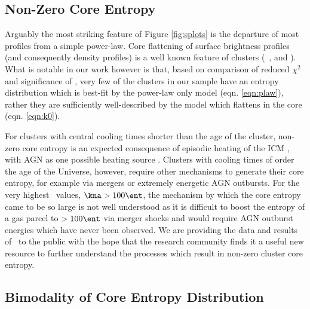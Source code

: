 \documentclass{emulateapj}
\begin{document}
\subsection{Non-Zero Core Entropy}
\label{sec:nonzerok0}

Arguably the most striking feature of Figure \ref{fig:splots} is the
departure of most profiles from a simple power-law. Core flattening of
surface brightness profiles (and consequently density profiles) is a
well known feature of clusters (\eg\ \citealt{1984ApJ...276...38J},
\citealt{1999ApJ...517..627M} and \citealt{2000MNRAS.318..715X}). What
is notable in our work however is that, based on comparison of reduced
$\chi^2$ and significance of \kna, very few of the clusters in our
sample have an entropy distribution which is best-fit by the power-law
only model (eqn. \ref{eqn:plaw}), rather they are sufficiently
well-described by the model which flattens in the core
(eqn. \ref{eqn:k0}).

For clusters with central cooling times shorter than the age of the
cluster, non-zero core entropy is an expected consequence of episodic
heating of the ICM \citep{agnframework}, with AGN as one possible
heating source \citep{1997MNRAS.288..355B, 2000ApJ...532...17L,
2001Natur.414..425V, 2001ApJ...549..832S, 2002MNRAS.332..729C,
2002Natur.418..301B, 2002MNRAS.331..545B, 2002MNRAS.333..145N,
2002ApJ...581..223R, 2002MNRAS.335..610A, 2004MNRAS.348.1105O,
2004ApJ...613..811M, 2004ApJ...615..681R, 2004ApJ...617..896H,
2004MNRAS.355..995D, 2005ApJ...622..847S, pizzolato05,
2006ApJ...643..120B, 2006ApJ...638..659M}. Clusters with cooling times
of order the age of the Universe, however, require other mechanisms to
generate their core entropy, for example via mergers or extremely
energetic AGN outbursts. For the very highest \kna\ values, $\kna >
100 \ent$, the mechanism by which the core entropy came to be so large
is not well understood as it is difficult to boost the entropy of a
gas parcel to $> 100 \ent$ via merger shocks
\citep{2008MNRAS.386.1309M} and would require AGN outburst energies
which have never been observed. We are providing the data and results
of \accept\ to the public with the hope that the research community
finds it a useful new resource to further understand the processes
which result in non-zero cluster core entropy.

\subsection{Bimodality of Core Entropy Distribution}
\label{sec:bimod}
\end{document}
